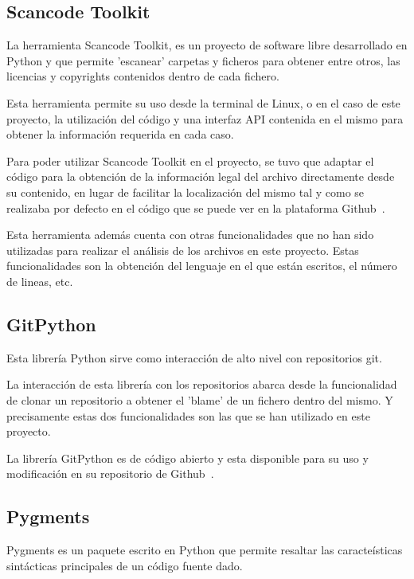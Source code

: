 \documentclass[a4paper, spanish, 12pt]{book}
\begin{document}
\subsection{Scancode Toolkit}
\label{subsec:scancode}

La herramienta Scancode Toolkit, es un proyecto de software libre desarrollado en
Python y que permite 'escanear' carpetas y ficheros para obtener entre otros, las
licencias y copyrights contenidos dentro de cada fichero.

Esta herramienta permite su uso desde la terminal de Linux, o en el caso de este proyecto,
la utilizaci\'on del c\'odigo y una interfaz API contenida en el mismo para obtener la
informaci\'on requerida en cada caso.

Para poder utilizar Scancode Toolkit en el proyecto, se tuvo que adaptar el c\'odigo
para la obtenci\'on de la informaci\'on legal del archivo directamente desde su contenido,
en lugar de facilitar la localizaci\'on del mismo tal y como se realizaba por defecto
en el c\'odigo que se puede ver en la plataforma Github~\cite{scancode}.

Esta herramienta adem\'as cuenta con otras funcionalidades que no han sido utilizadas
para realizar el an\'alisis de los archivos en este proyecto. Estas funcionalidades
son la obtenci\'on del lenguaje en el que est\'an escritos, el n\'umero de lineas, etc.

\subsection{GitPython}
\label{subsec:gitpython}

Esta librer\'ia Python sirve como interacci\'on de alto nivel con repositorios git.

La interacci\'on de esta librer\'ia con los repositorios abarca desde la funcionalidad
de clonar un repositorio a obtener el 'blame' de un fichero dentro del mismo.
Y precisamente estas dos funcionalidades son las que se han utilizado en este proyecto.

La librer\'ia GitPython es de c\'odigo abierto y esta disponible para su uso y modificaci\'on
en su repositorio de Github~\cite{gitpython}.

\subsection{Pygments}
\label{subsec:pygments}

Pygments es un paquete escrito en Python que permite resaltar las caracte\'isticas
sint\'acticas principales de un c\'odigo fuente dado.
\end{document}

